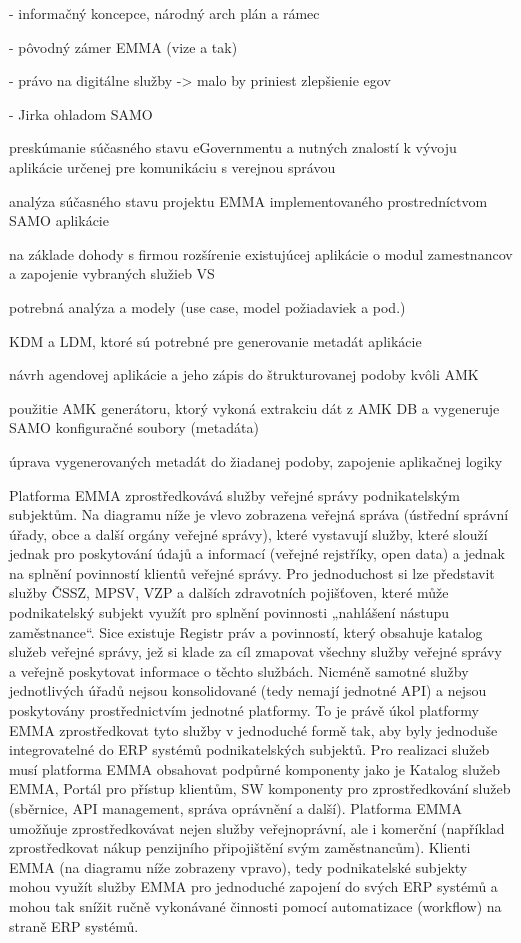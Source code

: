 - informačný koncepce, národný arch plán a rámec

- pôvodný zámer EMMA (vize a tak)

- právo na digitálne služby -> malo by priniest zlepšienie egov

- Jirka ohladom SAMO


\startitemize[n]
\item{preskúmanie súčasného stavu eGovernmentu a nutných znalostí k vývoju aplikácie určenej pre komunikáciu s verejnou správou}
\item{analýza súčasného stavu projektu EMMA implementovaného prostredníctvom SAMO aplikácie}
\item{na základe dohody s firmou rozšírenie existujúcej aplikácie o modul zamestnancov a zapojenie vybraných služieb VS}
\startitemize[a]
\item{potrebná analýza a modely (use case, model požiadaviek a pod.)}
\item{KDM a LDM, ktoré sú potrebné pre generovanie metadát aplikácie}
\item{návrh agendovej aplikácie a jeho zápis do štrukturovanej podoby kvôli AMK}
\item{použitie AMK generátoru, ktorý vykoná extrakciu dát z AMK DB a vygeneruje SAMO konfiguračné soubory (metadáta)}
\item{úprava vygenerovaných metadát do žiadanej podoby, zapojenie aplikačnej logiky}
\stopitemize
\stopitemize

Platforma EMMA zprostředkovává služby veřejné správy podnikatelským subjektům. Na diagramu níže je 
vlevo zobrazena veřejná správa (ústřední správní úřady, obce a další orgány veřejné správy), které 
vystavují služby, které slouží jednak pro poskytování údajů a informací (veřejné rejstříky, open data) a 
jednak na splnění povinností klientů veřejné správy. Pro jednoduchost si lze představit služby ČSSZ, MPSV, 
VZP a dalších zdravotních pojišťoven, které může podnikatelský subjekt využít pro splnění povinnosti 
„nahlášení nástupu zaměstnance“. Sice existuje Registr práv a povinností, který obsahuje katalog služeb 
veřejné správy, jež si klade za cíl zmapovat všechny služby veřejné správy a veřejně poskytovat informace 
o těchto službách. Nicméně samotné služby jednotlivých úřadů nejsou konsolidované (tedy nemají 
jednotné API) a nejsou poskytovány prostřednictvím jednotné platformy. To je právě úkol platformy 
EMMA zprostředkovat tyto služby v jednoduché formě tak, aby byly jednoduše integrovatelné do ERP 
systémů podnikatelských subjektů. Pro realizaci služeb musí platforma EMMA obsahovat podpůrné 
komponenty jako je Katalog služeb EMMA, Portál pro přístup klientům, SW komponenty pro 
zprostředkování služeb (sběrnice, API management, správa oprávnění a další). Platforma EMMA 
umožňuje zprostředkovávat nejen služby veřejnoprávní, ale i komerční (například zprostředkovat nákup 
penzijního připojištění svým zaměstnancům). Klienti EMMA (na diagramu níže zobrazeny vpravo), tedy 
podnikatelské subjekty mohou využít služby EMMA pro jednoduché zapojení do svých ERP systémů a 
mohou tak snížit ručně vykonávané činnosti pomocí automatizace (workflow) na straně ERP systémů. 


